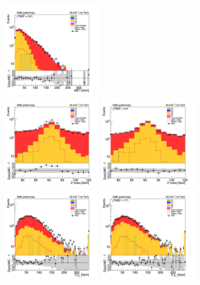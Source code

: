 \begin{figure}[tbp]
\begin{center}
    \includegraphics[width=0.31\textwidth]{figures/ee_300_april18/met_pt_ee_CRDY_FullPostfit_plot_apr18.png}\\
    \includegraphics[width=0.31\textwidth]{figures/ee_300_april18/zmass_ee_CRDY_prefit_plot_apr21.png}
    \includegraphics[width=0.31\textwidth]{figures/ee_300_april18/zmass_ee_CRDY_FullPostfit_plot_apr21.png}\\
    \includegraphics[width=0.31\textwidth]{figures/ee_300_april18/zpt0_ee_CRDY_prefit_plot_apr18.png}
    \includegraphics[width=0.31\textwidth]{figures/ee_300_april18/zpt0_ee_CRDY_FullPostfit_plot_apr18.png}\\

\end{center}
\end{figure}
